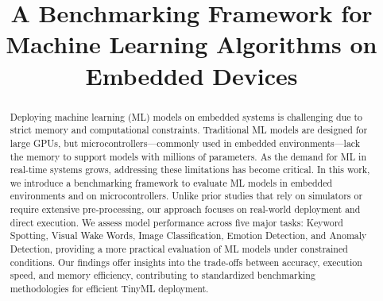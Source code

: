 \documentclass[conference]{IEEEtran}
\begin{document}
\title{A Benchmarking Framework for Machine Learning Algorithms on Embedded Devices\\

}

\author{
\and
{}
\and
{}
}

\maketitle

\begin{abstract}
Deploying machine learning (ML) models on embedded systems is challenging due to strict memory and computational constraints. Traditional ML models are designed for large GPUs, but microcontrollers—commonly used in embedded environments—lack the memory to support models with millions of parameters. As the demand for ML in real-time systems grows, addressing these limitations has become critical. In this work, we introduce a benchmarking framework to evaluate ML models in embedded environments and on microcontrollers. Unlike prior studies that rely on simulators or require extensive pre-processing, our approach focuses on real-world deployment and direct execution. We assess model performance across five major tasks: Keyword Spotting, Visual Wake Words, Image Classification, Emotion Detection, and Anomaly Detection, providing a more practical evaluation of ML models under constrained conditions. Our findings offer insights into the trade-offs between accuracy, execution speed, and memory efficiency, contributing to standardized benchmarking methodologies for efficient TinyML deployment.
\end{abstract}
\end{document}
